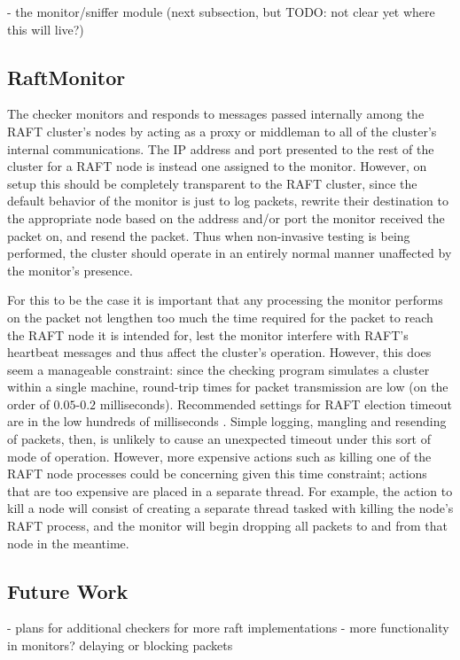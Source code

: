 \documentclass[UTF8]{article}
\begin{document}
- the monitor/sniffer module (next subsection, but TODO: not clear yet where this will live?)

\subsection{RaftMonitor}

The checker monitors and responds to messages passed internally among the RAFT cluster's nodes by acting as a proxy or middleman to all of the cluster's internal communications. The IP address and port presented to the rest of the cluster for a RAFT node is instead one assigned to the monitor. However, on setup this should be completely transparent to the RAFT cluster, since the default behavior of the monitor is just to log packets, rewrite their destination to the appropriate node based on the address and/or port the monitor received the packet on, and resend the packet. Thus when non-invasive testing is being performed, the cluster should operate in an entirely normal manner unaffected by the monitor's presence.

For this to be the case it is important that any processing the monitor performs on the packet not lengthen too much the time required for the packet to reach the RAFT node it is intended for, lest the monitor interfere with RAFT's heartbeat messages and thus affect the cluster's operation. However, this does seem a manageable constraint: since the checking program simulates a cluster within a single machine, round-trip times for packet transmission are low (on the order of $0.05$-$0.2$ milliseconds). Recommended settings for RAFT election timeout are in the low hundreds of milliseconds \cite{raftPaper}. Simple logging, mangling and resending of packets, then, is unlikely to cause an unexpected timeout under this sort of mode of operation. However, more expensive actions such as killing one of the RAFT node processes could be concerning given this time constraint; actions that are too expensive are placed in a separate thread. For example, the action to kill a node will consist of creating a separate thread tasked with killing the node's RAFT process, and the monitor will begin dropping all packets to and from that node in the meantime.

\subsection{Future Work}

- plans for additional checkers for more raft implementations
- more functionality in monitors? delaying or blocking packets
\end{document}

